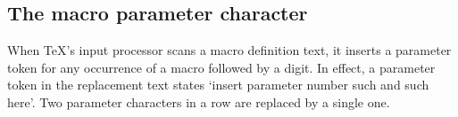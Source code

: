 \begin{comment}
However, only
one empty argument can be created this way: 
if the macro had been defined as
\begin{verbatim}
\def\mac#1#2\ro{ ... }
\end{verbatim}
the same call
\begin{verbatim}
\mac\ro \othermacro \stillothermacro
\end{verbatim}
will probably cause a `\n{Runaway argument?}' error message.
Explanation: the first parameter is undelimited, so the corresponding
argument is `\cs{ro}'; after that \TeX\ starts looking for a list
of tokens delimited by~\cs{ro}.
\end{comment}

\subsection{The macro parameter character}

When \TeX's input processor scans a macro definition text, it inserts
a parameter token for any occurrence of a macro
followed by a digit.  In effect, a
parameter token in the replacement text states `insert parameter
number such and such here'.  Two parameter characters in a row are
replaced by a single one.

